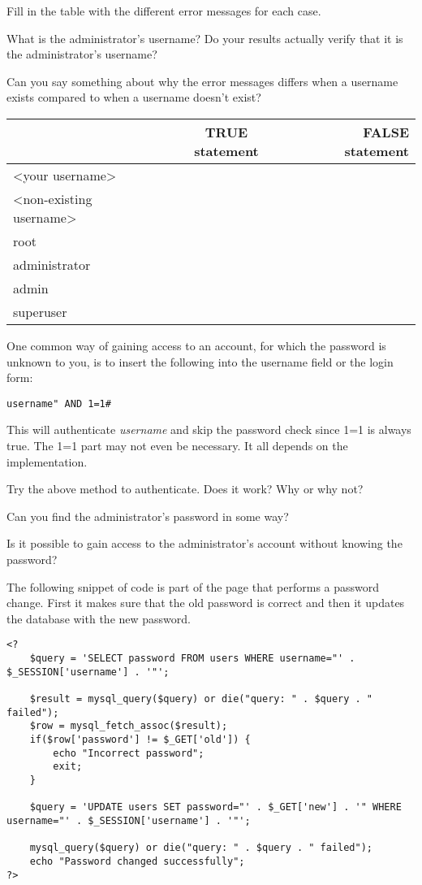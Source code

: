 \documentclass[EITN41]{../tex/cryptosecuritylab}
\begin{document}
\bprob
\item Fill in the table with the different error messages for each case.

What is the administrator's username? Do your results actually verify that it is the administrator's username?

Can you say something about why the error messages differs when a username exists compared to when a username doesn't exist?
\eprob

\begin{tabular}{| l |c |r |}
\hline
    & TRUE statement & FALSE statement \\
\hline
\textless your username\textgreater & & \\
\hline
\textless non-existing username\textgreater & & \\
\hline
  root &  &  \\
\hline
  administrator  &  &  \\
\hline
  admin &  &  \\
\hline
  superuser &  & \\
\hline
\end{tabular}

One common way of gaining access to an account, for which the password is unknown to you, is to insert the following into the username field or the login form:
\begin{verbatim}
username" AND 1=1#
\end{verbatim}
This will authenticate \textit{username} and skip the password check since 1=1 is always true. The 1=1 part may not even be necessary. It all depends on the implementation.

\bprob
\item Try the above method to authenticate. Does it work? Why or why not?
\item Can you find the administrator's password in some way?
\item Is it possible to gain access to the administrator's account without knowing the password?
\eprob

The following snippet of code is part of the page that performs a password change. First it makes sure that the old password is correct and then it updates the database with the new password.
\begingroup
    \fontsize{7pt}{8pt}\selectfont
\begin{verbatim}
<?
    $query = 'SELECT password FROM users WHERE username="' . $_SESSION['username'] . '"';

    $result = mysql_query($query) or die("query: " . $query . " failed");
    $row = mysql_fetch_assoc($result);
    if($row['password'] != $_GET['old']) {
        echo "Incorrect password";
        exit;
    }

    $query = 'UPDATE users SET password="' . $_GET['new'] . '" WHERE username="' . $_SESSION['username'] . '"';

    mysql_query($query) or die("query: " . $query . " failed");
    echo "Password changed successfully";
?>
\end{verbatim}
\endgroup
\end{document}
